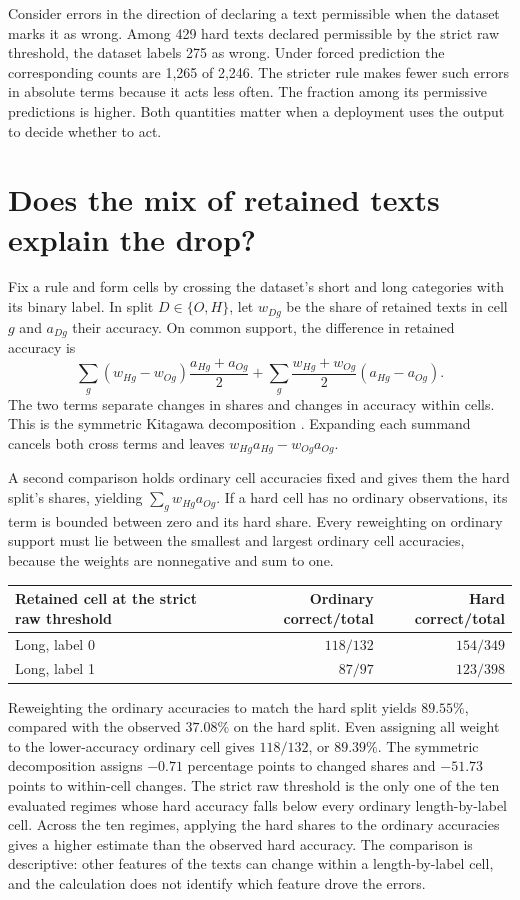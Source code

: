 \documentclass[11pt]{article}
\begin{document}
Consider errors in the direction of declaring a text permissible
when the dataset marks it as wrong. Among 429 hard texts declared
permissible by the strict raw threshold, the dataset labels
275 as wrong. Under forced prediction the corresponding counts are
1,265 of 2,246. The stricter rule makes fewer such errors in
absolute terms because it acts less often. The fraction among
its permissive predictions is higher. Both quantities matter
when a deployment uses the output to decide whether to act.

\section{Does the mix of retained texts explain the drop?}
Fix a rule and form cells by crossing the dataset's short and long
categories with its binary label. In split $D\in\{O,H\}$, let $w_{Dg}$
be the share of retained texts in cell $g$ and $a_{Dg}$ their accuracy.
On common support, the difference in retained accuracy is
\[
 \sum_g (w_{Hg}-w_{Og})\frac{a_{Hg}+a_{Og}}{2}
 +\sum_g \frac{w_{Hg}+w_{Og}}{2}(a_{Hg}-a_{Og}).
\]
The two terms separate changes in shares and changes in accuracy
within cells. This is the symmetric Kitagawa decomposition
\cite{oaxaca}. Expanding each summand cancels both cross terms and
leaves $w_{Hg}a_{Hg}-w_{Og}a_{Og}$.

A second comparison holds ordinary cell accuracies fixed and gives
them the hard split's shares, yielding $\sum_g w_{Hg}a_{Og}$.
If a hard cell has no ordinary observations, its term is bounded
between zero and its hard share. Every reweighting on ordinary
support must lie between the smallest and largest ordinary cell
accuracies, because the weights are nonnegative and sum to one.

\begin{center}
\small
\begin{tabular}{lrr}
\toprule
Retained cell at the strict raw threshold & Ordinary correct/total & Hard correct/total \\
\midrule
Long, label 0 & $118/132$ & $154/349$ \\
Long, label 1 & $87/97$ & $123/398$ \\
\bottomrule
\end{tabular}
\end{center}

Reweighting the ordinary accuracies to match the hard split yields
$89.55\%$, compared with the observed $37.08\%$ on the hard split.
Even assigning all weight to the lower-accuracy ordinary cell gives
$118/132$, or $89.39\%$. The symmetric decomposition assigns
$-0.71$ percentage points to changed shares and $-51.73$ points
to within-cell changes. The strict raw threshold is the only one
of the ten evaluated regimes whose hard accuracy falls below every
ordinary length-by-label cell. Across the ten regimes, applying the
hard shares to the ordinary accuracies gives a higher estimate
than the observed hard accuracy. The comparison is descriptive:
other features of the texts can change within a length-by-label
cell, and the calculation does not identify which feature drove
the errors.
\end{document}
